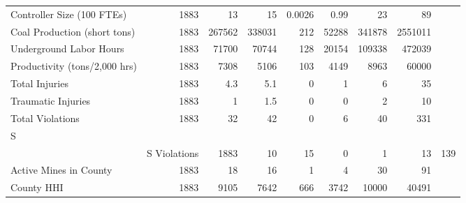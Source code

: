\begin{table}[!htbp]
{\begin{tabular}{lrrrrrrr}
Controller Size (100 FTEs) & 1883 & 13 & 15 & 0.0026 & 0.99 & 23 & 89 \\ 
Coal Production (short tons) & 1883 & 267562 & 338031 & 212 & 52288 & 341878 & 2551011 \\ 
Underground Labor Hours & 1883 & 71700 & 70744 & 128 & 20154 & 109338 & 472039 \\ 
Productivity (tons/2,000 hrs) & 1883 & 7308 & 5106 & 103 & 4149 & 8963 & 60000 \\ 
Total Injuries & 1883 & 4.3 & 5.1 & 0 & 1 & 6 & 35 \\ 
Traumatic Injuries & 1883 & 1 & 1.5 & 0 & 0 & 2 & 10 \\ 
Total Violations & 1883 & 32 & 42 & 0 & 6 & 40 & 331 \\ 
S\\&S Violations & 1883 & 10 & 15 & 0 & 1 & 13 & 139 \\ 
Active Mines in County & 1883 & 18 & 16 & 1 & 4 & 30 & 91 \\ 
County HHI & 1883 & 9105 & 7642 & 666 & 3742 & 10000 & 40491\\ 
\hline
\hline
\end{tabular}
}
\end{table}

